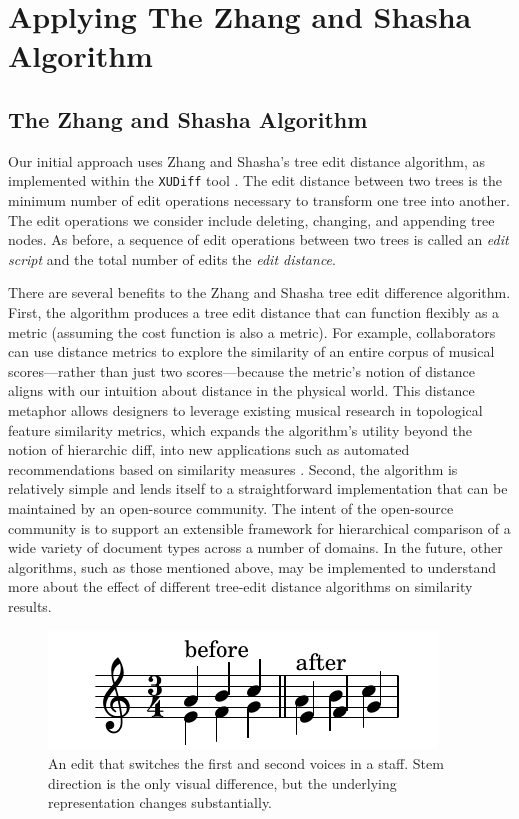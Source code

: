 \documentclass{article}
\begin{document}
\section{Applying The Zhang and Shasha Algorithm}
\subsection{The Zhang and Shasha Algorithm}
Our initial approach uses Zhang and Shasha's tree edit distance
algorithm, as implemented within the \texttt{XUDiff} tool
\cite{Weaver:2013sl}.  The edit distance between two trees is the
minimum number of edit operations necessary to transform one tree into
another.  The edit operations we consider include deleting, changing, and appending tree nodes.  As before, a sequence of edit operations
between two trees is called an \emph{edit script} and the total number of edits the \emph{edit distance}.



There are several benefits to the Zhang and Shasha tree edit
difference algorithm.  First, the algorithm produces a tree edit
distance that can function flexibly as a metric (assuming the cost function is also a metric). For example, collaborators
can use distance metrics to explore the similarity of an entire corpus of 
musical scores---rather than just two scores---because the metric's notion of distance aligns
with our intuition about distance in the physical world. This distance metaphor allows designers to leverage existing musical research in topological feature similarity metrics, which expands the algorithm's utility beyond the notion of hierarchic diff, into new applications such as automated recommendations based on similarity measures \cite{bello2011measuring,berenzweig2004large,panagakis2010music}. Second, the
algorithm is relatively simple and lends itself to a
straightforward implementation that can be maintained by an
open-source community.  The intent of the open-source community is to
support an extensible framework for hierarchical comparison of a wide
variety of document types across a number of domains.  In the future,
other algorithms, such as those mentioned above, may be implemented to
understand more about the effect of different tree-edit distance
algorithms on similarity results.

\begin{figure}[!htb]
\centering
\includegraphics[width=0.7\columnwidth]{layers.pdf}
\caption{An edit that switches the first and second voices in a staff. Stem direction is the only visual difference, but the underlying representation changes substantially.}
\label{fig:voice_swap}
\end{figure}
\end{document}
